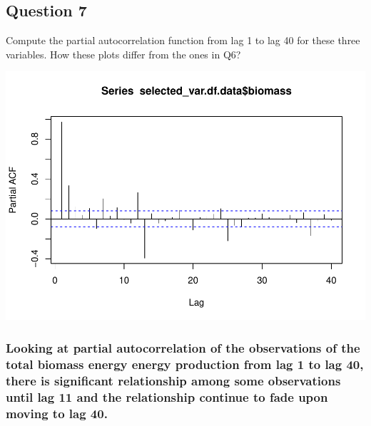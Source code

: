 \documentclass[
]{article}
\newenvironment{Shaded}{\begin{snugshade}}{\end{snugshade}}
\newcommand{\AttributeTok}[1]{\textcolor[rgb]{0.77,0.63,0.00}{#1}}
\newcommand{\ConstantTok}[1]{\textcolor[rgb]{0.00,0.00,0.00}{#1}}
\newcommand{\DecValTok}[1]{\textcolor[rgb]{0.00,0.00,0.81}{#1}}
\newcommand{\FunctionTok}[1]{\textcolor[rgb]{0.00,0.00,0.00}{#1}}
\newcommand{\NormalTok}[1]{#1}
\newcommand{\OtherTok}[1]{\textcolor[rgb]{0.56,0.35,0.01}{#1}}
\newcommand{\SpecialCharTok}[1]{\textcolor[rgb]{0.00,0.00,0.00}{#1}}
\begin{document}
\hypertarget{question-7}{%
\subsection{Question 7}\label{question-7}}

Compute the partial autocorrelation function from lag 1 to lag 40 for
these three variables. How these plots differ from the ones in Q6?

\begin{Shaded}
\end{Shaded}

\includegraphics{YaredAsfaw_TSA_A02_Sp22_files/figure-latex/unnamed-chunk-21-1.pdf}

\hypertarget{looking-at-partial-autocorrelation-of-the-observations-of-the-total-biomass-energy-energy-production-from-lag-1-to-lag-40-there-is-significant-relationship-among-some-observations-until-lag-11-and-the-relationship-continue-to-fade-upon-moving-to-lag-40.}{%
\subsubsection{Looking at partial autocorrelation of the observations of
the total biomass energy energy production from lag 1 to lag 40, there
is significant relationship among some observations until lag 11 and the
relationship continue to fade upon moving to lag
40.}\label{looking-at-partial-autocorrelation-of-the-observations-of-the-total-biomass-energy-energy-production-from-lag-1-to-lag-40-there-is-significant-relationship-among-some-observations-until-lag-11-and-the-relationship-continue-to-fade-upon-moving-to-lag-40.}}
\end{document}
